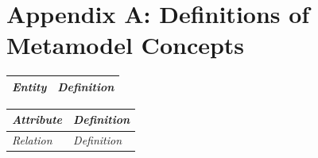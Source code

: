 \documentclass[a4paper]{llncs}
\begin{document}
\section*{Appendix A: Definitions of Metamodel Concepts}
\begin{minipage}{1\linewidth}
\begin{minipage}{0.30\textwidth} 

\begin{table}[H]
\vspace{-0.8cm}
\fontsize{6}{6.5}\selectfont

\begin{tabular}{|l p{4.5cm}|}
\hline
\textit{Entity} & \textit{Definition}  \\ \hline

\hline
 \end{tabular}
\end{table}
\end{minipage}
 \hspace{4em plus 1fill} 
\begin{minipage}{0.47\textwidth} 
 \begin{table}[H]
\fontsize{6}{6.5}\selectfont
\vspace{-0.8cm}
\label{table-entities}
\begin{tabular}{|l p{4.0cm}|}
 \hline
\textit{Attribute} & \textit{Definition}  \\ \hline


\hline
\textit{Relation} & \textit{Definition}  \\ \hline

 \hline
\end{tabular}
\end{table}

\end{minipage}
\end{minipage}
\end{document}
